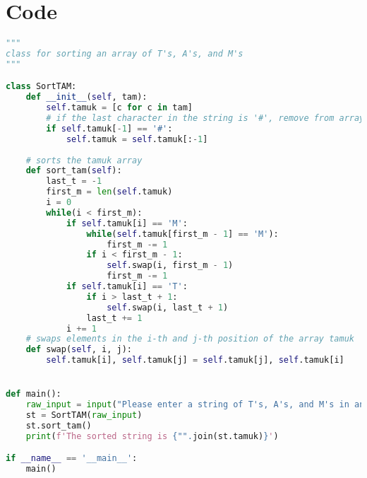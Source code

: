 \documentclass[12pt]{report}
\begin{document}
\chapter{Code}
\begin{lstlisting}[language=Python, caption=sort\_tam.py]
"""
class for sorting an array of T's, A's, and M's
"""

class SortTAM:
    def __init__(self, tam):
        self.tamuk = [c for c in tam]
        # if the last character in the string is '#', remove from array
        if self.tamuk[-1] == '#':
            self.tamuk = self.tamuk[:-1]
    
    # sorts the tamuk array
    def sort_tam(self):
        last_t = -1
        first_m = len(self.tamuk)
        i = 0
        while(i < first_m):
            if self.tamuk[i] == 'M':
                while(self.tamuk[first_m - 1] == 'M'):
                    first_m -= 1
                if i < first_m - 1:
                    self.swap(i, first_m - 1)
                    first_m -= 1
            if self.tamuk[i] == 'T':
                if i > last_t + 1:
                    self.swap(i, last_t + 1)
                last_t += 1
            i += 1
    # swaps elements in the i-th and j-th position of the array tamuk
    def swap(self, i, j):
        self.tamuk[i], self.tamuk[j] = self.tamuk[j], self.tamuk[i]


def main():
    raw_input = input("Please enter a string of T's, A's, and M's in any order (i.e. MMAATT):")
    st = SortTAM(raw_input)
    st.sort_tam()
    print(f'The sorted string is {"".join(st.tamuk)}')

if __name__ == '__main__':
    main()
\end{lstlisting}
\end{document}
